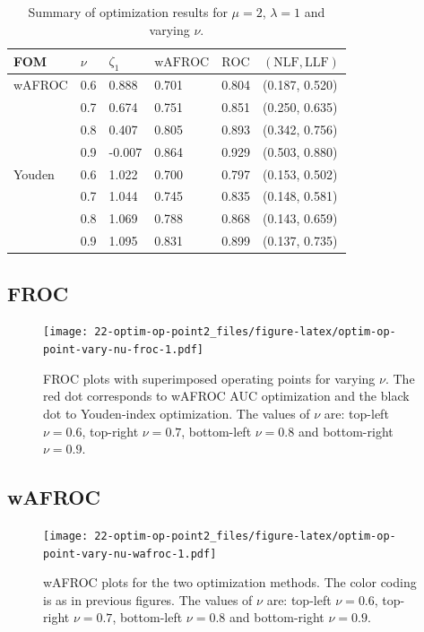 \documentclass[
]{book}
\begin{document}
\begin{table}

\caption{\label{tab:optim-op-point-table-vary-nu}Summary of optimization results for $\mu = 2$, $\lambda = 1$ and varying $\nu$.}
\centering
\fontsize{10}{12}\selectfont
\begin{tabular}[t]{llllll}
\toprule
FOM & $\nu$ & $\zeta_1$ & $\text{wAFROC}$ & $\text{ROC}$ & $\left( \text{NLF}, \text{LLF}\right)$\\
\midrule
wAFROC & 0.6 & 0.888 & 0.701 & 0.804 & (0.187, 0.520)\\
 & 0.7 & 0.674 & 0.751 & 0.851 & (0.250, 0.635)\\
 & 0.8 & 0.407 & 0.805 & 0.893 & (0.342, 0.756)\\
 & 0.9 & -0.007 & 0.864 & 0.929 & (0.503, 0.880)\\
Youden & 0.6 & 1.022 & 0.700 & 0.797 & (0.153, 0.502)\\
\addlinespace
 & 0.7 & 1.044 & 0.745 & 0.835 & (0.148, 0.581)\\
 & 0.8 & 1.069 & 0.788 & 0.868 & (0.143, 0.659)\\
 & 0.9 & 1.095 & 0.831 & 0.899 & (0.137, 0.735)\\
\bottomrule
\end{tabular}
\end{table}

\hypertarget{froc-3}{%
\subsection{FROC}\label{froc-3}}

\begin{figure}
\centering
\texttt{[image: 22-optim-op-point2\_files/figure-latex/optim-op-point-vary-nu-froc-1.pdf]}
\caption{\label{fig:optim-op-point-vary-nu-froc}FROC plots with superimposed operating points for varying \(\nu\). The red dot corresponds to wAFROC AUC optimization and the black dot to Youden-index optimization. The values of \(\nu\) are: top-left \(\nu = 0.6\), top-right \(\nu = 0.7\), bottom-left \(\nu = 0.8\) and bottom-right \(\nu = 0.9\).}
\end{figure}

\hypertarget{wafroc-3}{%
\subsection{wAFROC}\label{wafroc-3}}

\begin{figure}
\centering
\texttt{[image: 22-optim-op-point2\_files/figure-latex/optim-op-point-vary-nu-wafroc-1.pdf]}
\caption{\label{fig:optim-op-point-vary-nu-wafroc}wAFROC plots for the two optimization methods. The color coding is as in previous figures. The values of \(\nu\) are: top-left \(\nu = 0.6\), top-right \(\nu = 0.7\), bottom-left \(\nu = 0.8\) and bottom-right \(\nu = 0.9\).}
\end{figure}
\end{document}
